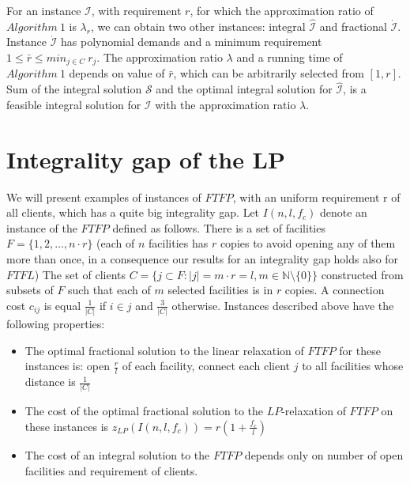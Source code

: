 \documentclass{llncs}
\begin{document}
\begin{corollary}
 For an instance $\mathcal{I}$, with requirement $r$, for which the approximation ratio of $Algorithm~1$ is $\lambda_r$, we can obtain two other instances: integral $\mathcal{\hat I}$ and fractional $\mathcal{\dot I}$. Instance $\mathcal{\dot I}$ has polynomial demands and a minimum requirement $1 \leq \bar r \leq min_{j \in C}~r_j$. The approximation ratio $\lambda$ and a running time of $Algorithm~1$ depends on value of $\bar r$, which can be arbitrarily selected from $[1,r] $. Sum of the integral solution $\mathcal{S}$ and the optimal integral solution for $\mathcal{\hat I}$, is a feasible integral solution for $\mathcal{I}$ with the approximation ratio $\lambda$.
\end{corollary}

\section{Integrality gap of the LP}
\label{int_gap_section}
We will present examples of instances of $FTFP$, with an uniform requirement r of all clients, which has a quite big integrality gap. Let $I(n, l, f_c)$ denote an instance of the $FTFP$ defined as follows. There is a set of facilities $F = \{1, 2, \dots, n \cdot r\}$ (each of $n$ facilities has $r$ copies to avoid opening any of them more than once, in a consequence our results for an integrality gap holds also for $FTFL$) The set of clients $C = \{j \subset F : |j| = m \cdot r = l, m \in \mathbb{N} \setminus \{0\}\}$ constructed from subsets of $F$ such that each of $m$ selected facilities is in $r$ copies. A connection cost $c_{ij}$ is equal $\frac{1}{|C|}$ if $i \in j$ and $\frac{3}{|C|}$ otherwise. Instances described above have the following properties:

\begin{itemize}
\renewcommand{\labelitemi}{$\bullet$}
 \item The optimal fractional solution to the linear relaxation of $FTFP$ for these instances is: open $\frac{r}{l}$ of each facility, connect each client $j$ to all facilities whose distance is $\frac{1}{|C|}$
 \item The cost of the optimal fractional solution to the $LP$-relaxation of $FTFP$ on these instances is $z_{LP}(I(n, l, f_c)) = r(1 + \frac{f_c}{l})$ 
 \item The cost of an integral solution to the $FTFP$ depends only on number of open facilities and requirement of clients.
\end{itemize}
\end{document}

